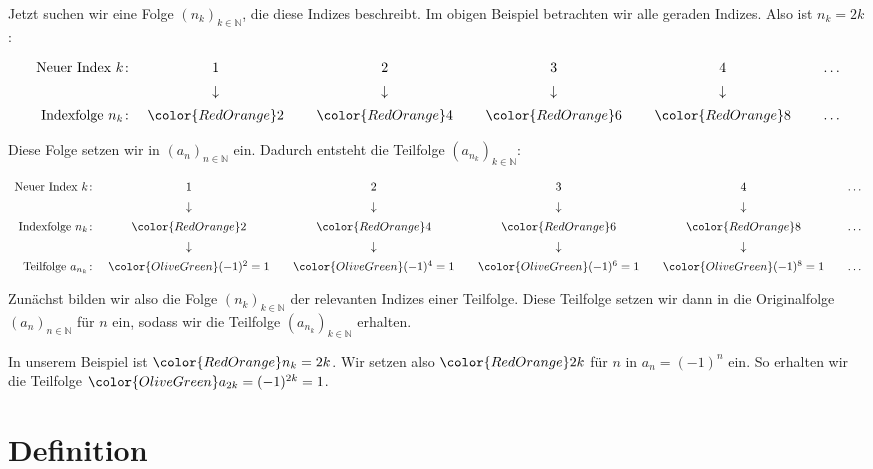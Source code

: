 \documentclass[fontsize=9pt,
               parskip=half-,
               DIV=14,
               listof=chapterentry,
               tocflat]{scrbook}
\begin{document}
Jetzt suchen wir eine Folge $\left(n_{k}\right)_{k\in \mathbb {N} }$, die diese Indizes beschreibt. Im obigen Beispiel betrachten wir alle geraden Indizes. Also ist $n_{k}=2k$:

\begin{align*}
{\begin{array}{rccccccccccccc}{\text{Neuer Index }}k\colon &1&\ &2&\ &3&\ &4&\ &\ldots \\[0.5em]&\downarrow &&\downarrow &&\downarrow &&\downarrow &&\\[0.5em]{\text{Indexfolge }}n_{k}\colon &{\color {RedOrange}2}&\ &{\color {RedOrange}4}&\ &{\color {RedOrange}6}&\ &{\color {RedOrange}8}&\ &\ldots \end{array}}
\end{align*}

Diese Folge setzen wir in $\left(a_{n}\right)_{n\in \mathbb {N} }$ ein. Dadurch entsteht die Teilfolge $\left(a_{n_{k}}\right)_{k\in \mathbb {N} }$:

\begin{align*}
{\begin{array}{rccccccccccccc}{\text{Neuer Index }}k\colon &1&&2&&3&&4&&\ldots \\[0.5em]&\downarrow &&\downarrow &&\downarrow &&\downarrow &&\\[0.5em]{\text{Indexfolge }}n_{k}\colon &{\color {RedOrange}2}&&{\color {RedOrange}4}&&{\color {RedOrange}6}&&{\color {RedOrange}8}&&\ldots \\[0.5em]&\downarrow &&\downarrow &&\downarrow &&\downarrow &&\\[0.5em]{\text{Teilfolge }}a_{n_{k}}\colon &{\color {OliveGreen}(-1)^{2}=1}&&{\color {OliveGreen}(-1)^{4}=1}&&{\color {OliveGreen}(-1)^{6}=1}&&{\color {OliveGreen}(-1)^{8}=1}&&\ldots \end{array}}
\end{align*}

Zunächst bilden wir also die Folge $\left(n_{k}\right)_{k\in \mathbb {N} }$ der relevanten Indizes einer Teilfolge. Diese Teilfolge setzen wir dann in die Originalfolge $\left(a_{n}\right)_{n\in \mathbb {N} }$ für $n$ ein, sodass wir die Teilfolge $\left(a_{n_{k}}\right)_{k\in \mathbb {N} }$ erhalten.

In unserem Beispiel ist ${\color {RedOrange}n_{k}=2k}$. Wir setzen also ${\color {RedOrange}2k}$ für $n$ in $a_{n}=(-1)^{n}$ ein. So erhalten wir die Teilfolge ${\color {OliveGreen}a_{2k}=(-1)^{2k}=1}$.

\section{Definition}
\end{document}
